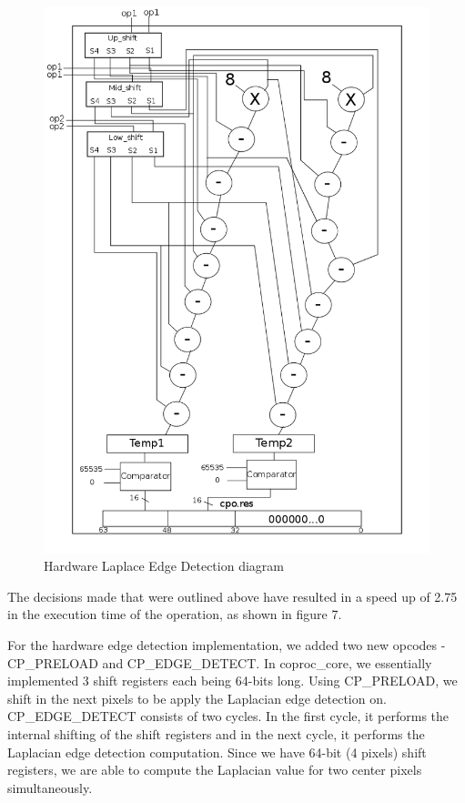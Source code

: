 \documentclass{article}
\begin{document}
	\begin{figure}[H]
		\begin{center}
			\includegraphics[scale=0.45]{./edge_detection.png}
			\caption{Hardware Laplace Edge Detection diagram}
		\end{center}
	\end{figure}

The decisions made that were outlined above have resulted in a speed up of 2.75 in the execution time of the operation, as shown in figure 7.

For the hardware edge detection implementation, we added two new opcodes - CP_PRELOAD and CP_EDGE_DETECT. In coproc_core, we essentially implemented 3 shift registers each being 64-bits long. Using CP_PRELOAD, we shift in the next pixels to be apply the Laplacian edge detection on. CP_EDGE_DETECT consists of two cycles. In the first cycle, it performs the internal shifting of the shift registers and in the next cycle, it performs the Laplacian edge detection computation. Since we have 64-bit (4 pixels) shift registers, we are able to compute the Laplacian value for two center pixels simultaneously.\\
\end{document}
